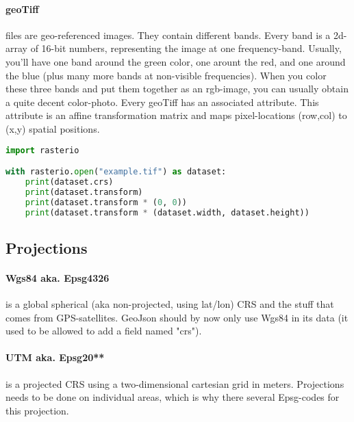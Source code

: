 \paragraph{geoTiff} files are geo-referenced images. They contain different bands. Every band is a 2d-array of 16-bit numbers, representing the image at one frequency-band. Usually, you'll have one band around the green color, one arount the red, and one around the blue (plus many more bands at non-visible frequencies). When you color these three bands and put them together as an rgb-image, you can usually obtain a quite decent color-photo. 
Every geoTiff has an associated  attribute. This attribute is an affine transformation matrix and maps pixel-locations (row,col) to (x,y) spatial positions.
\begin{lstlisting}[language=python]
import rasterio

with rasterio.open("example.tif") as dataset:
    print(dataset.crs)
    print(dataset.transform)
    print(dataset.transform * (0, 0))
    print(dataset.transform * (dataset.width, dataset.height))
\end{lstlisting}


\subsection{Projections}

\paragraph{Wgs84 aka. Epsg4326} is a global spherical (aka non-projected, using lat/lon) CRS and the stuff that comes from GPS-satellites. GeoJson should by now only  use Wgs84 in its data (it used to be allowed to add a field named "crs"). 
\paragraph{UTM aka. Epsg20**} is a projected CRS using a  two-dimensional cartesian grid in meters. Projections needs to be done on individual areas, which is why there several Epsg-codes for this projection.

